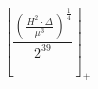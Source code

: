 \[\left\lfloor \frac{\left(\frac{H^{2} \cdot \Delta}{\mu^{3}}\right)^{\frac{1}{4}}}{2^{39}} \right\rfloor_{+}\]
